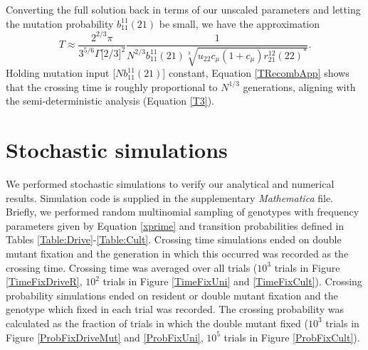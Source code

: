 \documentclass[review,3p,authoryear]{elsarticle}
\begin{document}
\begin{appendices}
Converting the full solution back in terms of our unscaled parameters
and letting the mutation probability $b_{11}^{11}(21)$ be small, we have the approximation
\begin{equation}\label{TRecombApp}
T \approx \frac{ 2^{2/3} \pi }{3^{5/6} \Gamma \Big[ 2/3 \Big]^2} \frac{1}{N^{2/3} b_{11}^{11}(21) \sqrt[3]{u_{22}c_\mu (1+c_\mu) r_{21}^{12}(22)^*} }.
\end{equation} 
Holding mutation input [$Nb_{11}^{11}(21)$] constant, Equation \eqref{TRecombApp} shows that the crossing time is roughly proportional to $N^{1/3}$ generations, aligning with the semi-deterministic analysis (Equation \ref{T3}).


\section{Stochastic simulations}
\label{App:Simulations}
\renewcommand{\theequation}{D\arabic{equation}}
\setcounter{equation}{0} 

We performed stochastic simulations to verify our analytical and numerical results.
Simulation code is supplied in the supplementary \textit{Mathematica} file.
Briefly, we performed random multinomial sampling of genotypes with frequency parameters given by Equation \eqref{xprime} and transition probabilities defined in Tables \ref{Table:Drive}-\ref{Table:Cult}.
Crossing time simulations ended on double mutant fixation and the generation in which this occurred was recorded as the crossing time.
Crossing time was averaged over all trials ($10^3$ trials in Figure \ref{TimeFixDriveR}, $10^2$ trials in Figure \ref{TimeFixUni} and \ref{TimeFixCult}).
Crossing probability simulations ended on resident or double mutant fixation and the genotype which fixed in each trial was recorded.
The crossing probability was calculated as the fraction of trials in which the double mutant fixed ($10^3$ trials in Figure \ref{ProbFixDriveMut} and \ref{ProbFixUni}, $10^5$ trials in Figure \ref{ProbFixCult}).

\end{appendices}

\end{document}
